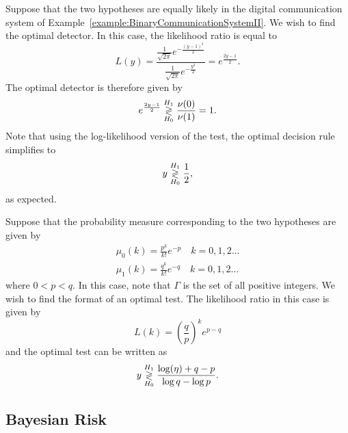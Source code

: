 \begin{example}
Suppose that the two hypotheses are equally likely in the digital communication system of Example~\ref{example:BinaryCommunicationSystemII}.
We wish to find the optimal detector.
In this case, the likelihood ratio is equal to
\begin{equation*}
L(y) = \frac
{ \frac{1}{\sqrt{2 \pi}} e^{- \frac{(y-1)^2}{2}} }
{ \frac{1}{\sqrt{2 \pi}} e^{- \frac{y^2}{2}} }
= e^{ \frac{2y-1}{2} } .
\end{equation*}
The optimal detector is therefore given by
\begin{equation*}
e^{ \frac{2y-1}{2} }
\overset{H_1}{ \underset{H_0}{\gtrless} } \frac{ \nu(0) }{ \nu(1) } = 1 .
\end{equation*}
Note that using the log-likelihood version of the test, the optimal decision rule simplifies to
\begin{equation*}
y \overset{H_1}{ \underset{H_0}{\gtrless} } \frac{1}{2} ,
\end{equation*}
as expected.
\end{example}

\begin{example}
Suppose that the probability measure corresponding to the two hypotheses are given by
\begin{align*}
\mu_0 (k) = \frac{ p^k }{k!} e^{-p} \quad k = 0, 1, 2 \ldots \\
\mu_1 (k) = \frac{ q^k }{k!} e^{-q} \quad k = 0, 1, 2 \ldots
\end{align*}
where $0<p<q$.
In this case, note that $\Gamma$ is the set of all positive integers.
We wish to find the format of an optimal test.
The likelihood ratio in this case is given by
\begin{equation*}
L(k) = \left( \frac{q}{p} \right)^k e^{p - q}
\end{equation*}
and the optimal test can be written as
\begin{equation*}
y \overset{H_1}{ \underset{H_0}{\gtrless} } \frac{ \log ( \eta ) + q - p }{ \log q - \log p} .
\end{equation*}
\end{example}


\subsection{Bayesian Risk}

